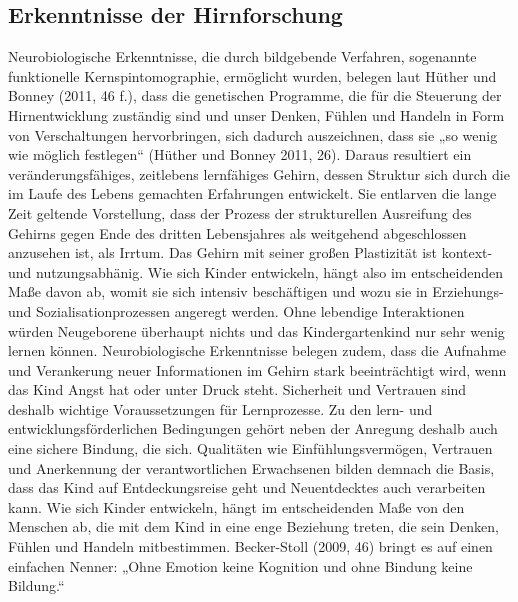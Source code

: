 \subsection{Erkenntnisse der Hirnforschung}
Neurobiologische Erkenntnisse, die durch bildgebende Verfahren, sogenannte funktionelle Kernspintomographie, ermöglicht wurden,
belegen laut Hüther und Bonney (2011, 46 f.), dass die genetischen Programme, die für die Steuerung der Hirnentwicklung zuständig sind und unser Denken, Fühlen und Handeln in Form von Verschaltungen hervorbringen, sich dadurch auszeichnen, dass sie „so wenig wie möglich festlegen“ (Hüther und Bonney 2011, 26). Daraus resultiert ein veränderungsfähiges, zeitlebens lernfähiges Gehirn, dessen Struktur sich durch die im Laufe des Lebens gemachten Erfahrungen entwickelt. Sie entlarven die lange Zeit geltende Vorstellung, dass der Prozess der strukturellen Ausreifung des Gehirns gegen Ende des dritten Lebensjahres als weitgehend abgeschlossen anzusehen ist, als Irrtum. Das Gehirn mit seiner großen Plastizität ist kontext- und nutzungsabhänig. Wie sich Kinder entwickeln, hängt also im entscheidenden Maße davon ab, womit sie sich intensiv beschäftigen und wozu sie in Erziehungs- und Sozialisationprozessen angeregt werden. Ohne lebendige Interaktionen würden Neugeborene überhaupt nichts und das Kindergartenkind nur sehr wenig lernen können. Neurobiologische Erkenntnisse belegen zudem, dass die Aufnahme und Verankerung neuer Informationen im Gehirn stark beeinträchtigt wird, wenn das Kind Angst hat oder unter Druck steht. Sicherheit und Vertrauen sind deshalb wichtige Voraussetzungen für Lernprozesse. Zu den lern- und entwicklungsförderlichen Bedingungen gehört neben der Anregung deshalb 
auch eine sichere Bindung, die sich. Qualitäten wie Einfühlungsvermögen, Vertrauen und Anerkennung der verantwortlichen Erwachsenen bilden demnach die Basis, dass das Kind auf Entdeckungsreise geht und Neuentdecktes auch verarbeiten kann. Wie sich Kinder entwickeln, hängt im entscheidenden Maße von den Menschen ab, die mit dem Kind in eine enge Beziehung treten, die sein Denken, Fühlen und Handeln mitbestimmen.
Becker-Stoll (2009, 46) bringt es auf einen einfachen Nenner: „Ohne Emotion keine Kognition und ohne Bindung keine Bildung.“ 


